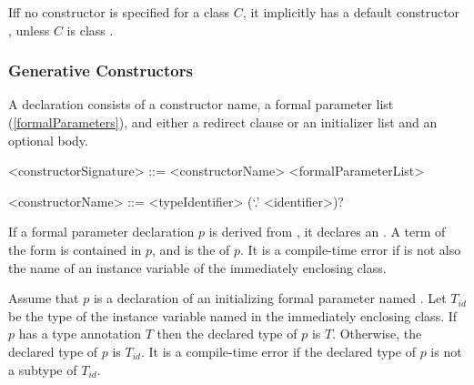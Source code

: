 \documentclass[makeidx]{article}
\begin{document}

\LMHash{}%
If{}f no constructor is specified for a class $C$, it implicitly has a default constructor , unless $C$ is class .


\subsubsection{Generative Constructors}

\LMHash{}%
A 
declaration consists of a constructor name, a formal parameter list
(\ref{formalParameters}),
and either a redirect clause or an initializer list and an optional body.

\begin{grammar}
<constructorSignature> ::= <constructorName> <formalParameterList>

<constructorName> ::= <typeIdentifier> (`.' <identifier>)?
\end{grammar}


\LMHash{}%
If a formal parameter declaration $p$ is derived from
,
it declares an .
A term of the form  is contained in $p$,
and \id{} is the  of $p$.
It is a compile-time error if \id{} is not also the name of
an instance variable of the immediately enclosing class.


\LMHash{}%
Assume that $p$ is a declaration of an initializing formal parameter named \id.
Let $T_{id}$ be the type of the instance variable named \id{} in
the immediately enclosing class.
If $p$ has a type annotation $T$ then the declared type of $p$ is $T$.
Otherwise, the declared type of $p$ is $T_{id}$.
It is a compile-time error if the declared type of $p$
is not a subtype of $T_{id}$.
\end{document}
